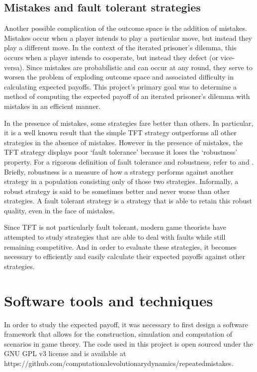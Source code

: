 \documentclass[a4paper,12pt]{article}
\begin{document}
\subsection*{Mistakes and fault tolerant strategies}

Another possible complication of the outcome space is the addition of mistakes.
Mistakes occur when a player intends to play a particular move, but instead they play a different move.
In the context of the iterated prisoner's dilemma, this occurs when a player intends to cooperate, but instead they defect (or vice-versa).
Since mistakes are probabilistic and can occur at any round, they serve to worsen the problem of exploding outcome space and associated difficulty in calculating expected payoffs.
This project's primary goal was to determine a method of computing the expected payoff of an iterated prisoner's dilemma with mistakes in an efficient manner.

In the presence of mistakes, some strategies fare better than others.
In particular, it is a well known result \cite{axelrod} that the simple TFT strategy outperforms all other strategies in the absence of mistakes.
However in the presence of mistakes, the TFT strategy displays poor `fault tolerance' because it loses the `robustness' property.
For a rigorous definition of fault tolerance and robustness, refer to \cite{pelc} and \cite{pelcpelc}.
Briefly, robustness is a measure of how a strategy performs against another strategy in a population consisting only of those two strategies.
Informally, a robust strategy is said to be sometimes better and never worse than other strategies.
A fault tolerant strategy is a strategy that is able to retain this robust quality, even in the face of mistakes.

Since TFT is not particularly fault tolerant, modern game theorists have attempted to study strategies that are able to deal with faults while still remaining competitive.
And in order to evaluate these strategies, it becomes necessary to efficiently and easily calculate their expected payoffs against other strategies.

\section*{Software tools and techniques}

In order to study the expected payoff, it was necessary to first design a software framework that allows for the construction, simulation and computation of scenarios in game theory.
The code used in this project is open sourced under the GNU GPL v3 license and is available at https://github.com/computationalevolutionarydynamics/repeatedmistakes.
\end{document}
